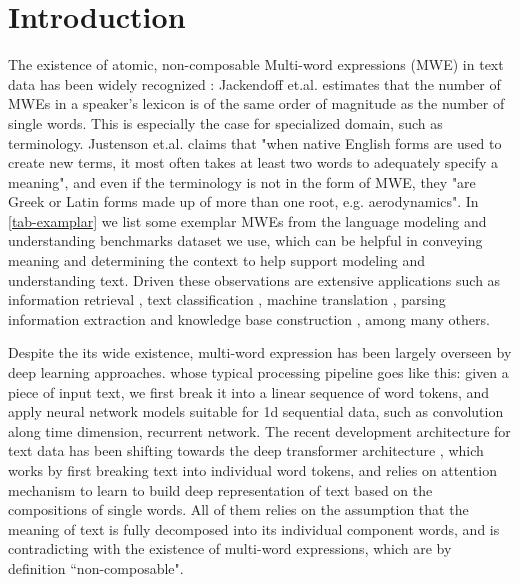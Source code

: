 


\section{Introduction}
The existence of atomic, non-composable Multi-word expressions (MWE) in text data has been widely recognized :  Jackendoff et.al. \cite{jackendoff1997architecture} estimates that 
the number of MWEs in a speaker's lexicon is of the same order of magnitude as the number of single words.
This is especially the case for specialized domain, such as terminology. 
Justenson et.al. \cite{justeson1995technical} claims that 
"when native English forms are used to create new terms, 
it most often takes at least two words to adequately specify a meaning", 
and even if the terminology is not in the form of MWE, they 
"are Greek or Latin forms made up of more than one root, e.g. aerodynamics". 
In \autoref{tab-examplar} we list some exemplar MWEs from the language modeling and understanding benchmarks dataset we use, 
which can be helpful in conveying meaning and determining the context 
to help support modeling and understanding text.
Driven these observations are extensive applications such as information retrieval \cite{xiong2015query, dalton2014entity, shen2018entity}, text classification \cite{furnkranz1998study}, machine translation \cite{koehn2003statistical}, parsing \cite{cafferkey2007multi, savary2015parseme} information extraction and knowledge base construction \cite{banko2007open, wu2012probase, ren2016automatic}, among many others.


Despite the its wide existence,  multi-word expression has been largely overseen by deep learning approaches.
whose typical processing pipeline goes like this:
given a piece of input text, we first break it into a linear sequence of word tokens, and apply neural network models suitable for 1d sequential data, 
such as convolution along time dimension, recurrent network.
The recent development architecture for text data has been shifting towards the deep transformer architecture \cite{vaswani2017attention}, 
which works by first breaking text into individual word tokens, 
and relies on attention mechanism to learn to build deep representation of text based on the compositions of single words.
All of them relies on the assumption that the meaning of text is fully decomposed into its individual component words, and is contradicting with the existence of multi-word expressions, which are by definition ``non-composable".

